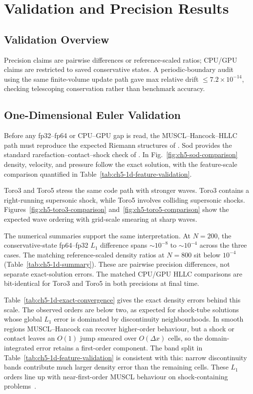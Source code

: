 
\chapter{Validation and Precision Results}

\section{Validation Overview}
Precision claims are pairwise differences or reference-scaled ratios; CPU/GPU claims are restricted to saved conservative states. A periodic-boundary audit using the same finite-volume update path gave max relative drift \(\le 7.2\times10^{-14}\), checking telescoping conservation rather than benchmark accuracy.

\section{One-Dimensional Euler Validation}
Before any fp32--fp64 or CPU--GPU gap is read, the MUSCL--Hancock--HLLC path
must reproduce the expected Riemann structures of \citet{toro2009}. Sod
provides the standard rarefaction--contact--shock check of
\citet{sod_1978}. In Fig.~\ref{fig:ch5-sod-comparison} density, velocity, and
pressure follow the exact solution, with the feature-scale comparison
quantified in Table~\ref{tab:ch5-1d-feature-validation}.

Toro3 and Toro5 stress the same code path with stronger waves. Toro3 contains a
right-running supersonic shock, while Toro5 involves colliding supersonic
shocks. Figures~\ref{fig:ch5-toro3-comparison}
and~\ref{fig:ch5-toro5-comparison} show the expected wave ordering with
grid-scale smearing at sharp waves.

The numerical summaries support the same interpretation. At $N=200$, the
conservative-state fp64--fp32 $L_1$ difference spans $\sim 10^{-8}$ to
$\sim 10^{-4}$ across the three cases. The matching reference-scaled density
ratios at $N=800$ sit below $10^{-4}$ (Table~\ref{tab:ch5-1d-summary}). These
are pairwise precision differences, not separate exact-solution errors. The
matched CPU/GPU HLLC comparisons are bit-identical for Toro3 and Toro5 in both
precisions at final time.

Table~\ref{tab:ch5-1d-exact-convergence} gives the exact density errors behind
this scale. The observed orders are below two, as expected for shock-tube
solutions whose global $L_1$ error is dominated by discontinuity neighbourhoods.
In smooth regions MUSCL--Hancock can recover higher-order behaviour, but a shock
or contact leaves an $O(1)$ jump smeared over $O(\Delta x)$ cells, so the
domain-integrated error retains a first-order component. The band split in
Table~\ref{tab:ch5-1d-feature-validation} is consistent with this: narrow
discontinuity bands contribute much larger density error than the remaining
cells. These $L_1$ orders line up with near-first-order MUSCL behaviour on shock-containing problems~\citep{toro2009, leveque_2002}.

